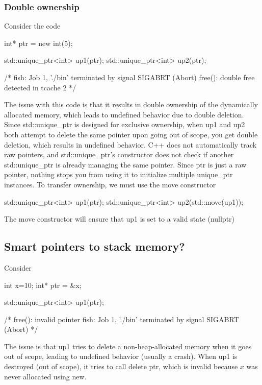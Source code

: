 \documentclass{report}
\begin{document}
\subsubsection{Double ownership}
\bigbreak \noindent 
Consider the code
\bigbreak \noindent 
\begin{cppcode}
    int* ptr = new int(5);

    std::unique_ptr<int> up1(ptr);
    std::unique_ptr<int> up2(ptr);

    /*
    fish: Job 1, './bin' terminated by signal SIGABRT (Abort)
    free(): double free detected in tcache 2
    */
\end{cppcode}
\bigbreak \noindent 
The issue with this code is that it results in double ownership of the dynamically allocated memory, which leads to undefined behavior due to double deletion.
\bigbreak \noindent 
Since std::unique\_ptr is designed for exclusive ownership, when up1 and up2 both attempt to delete the same pointer upon going out of scope, you get double deletion, which results in undefined behavior.
\bigbreak \noindent 
C++ does not automatically track raw pointers, and std::unique\_ptr's constructor does not check if another std::unique\_ptr is already managing the same pointer. Since ptr is just a raw pointer, nothing stops you from using it to initialize multiple unique\_ptr instances.
\bigbreak \noindent 
To transfer ownership, we must use the move constructor
\bigbreak \noindent 
\begin{cppcode}
    std::unique_ptr<int> up1(ptr);
    std::unique_ptr<int> up2(std::move(up1));
\end{cppcode}
\bigbreak \noindent 
The move constructor will ensure that up1 is set to a valid state (nullptr)

\bigbreak \noindent 
\subsection{Smart pointers to stack memory?}
\bigbreak \noindent 
Consider
\bigbreak \noindent 
\begin{cppcode}
    int x=10;
    int* ptr = &x;

    std::unique_ptr<int> up1(ptr);

    /*
    free(): invalid pointer
    fish: Job 1, './bin' terminated by signal SIGABRT (Abort)
    */
\end{cppcode}
\bigbreak \noindent 
The issue is that up1 tries to delete a non-heap-allocated memory when it goes out of scope, leading to undefined behavior (usually a crash).
\bigbreak \noindent 
When up1 is destroyed (out of scope), it tries to call delete ptr, which is invalid because $x$ was never allocated using new.
\end{document}
